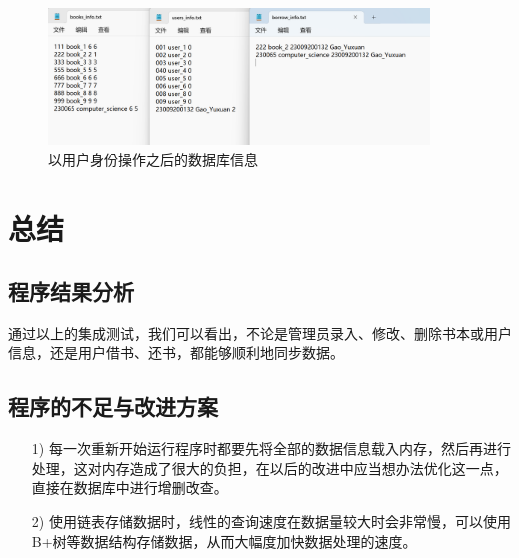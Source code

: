 \documentclass{ctexart}
\begin{document}
    \begin{figure}[!htbp] %
        \centering
        \includegraphics[width=0.9\textwidth]{src/user_result.png}
        \caption{以用户身份操作之后的数据库信息}    
    \end{figure}
    
    \section{总结}
    
    \subsection{程序结果分析}
    通过以上的集成测试，我们可以看出，不论是管理员录入、修改、删除书本或用户信息，还是用户借书、还书，都能够顺利地同步数据。
    
    \subsection{程序的不足与改进方案}
    \begin{enumerate}
        \item[1)] 每一次重新开始运行程序时都要先将全部的数据信息载入内存，然后再进行处理，这对内存造成了很大的负担，在以后的改进中应当想办法优化这一点，直接在数据库中进行增删改查。
        \item[2)] 使用链表存储数据时，线性的查询速度在数据量较大时会非常慢，可以使用B+树等数据结构存储数据，从而大幅度加快数据处理的速度。
    \end{enumerate}
    

    
    
\end{document}
